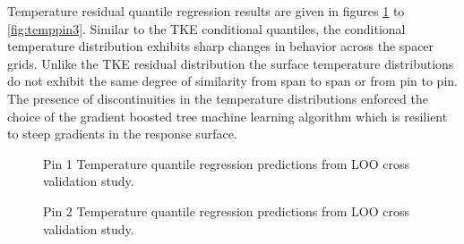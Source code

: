 Temperature residual quantile regression results are given in figures \ref{fig:temppin1} to \ref{fig:temppin3}.  Similar to the TKE conditional quantiles, the conditional temperature distribution exhibits sharp changes in behavior across the spacer grids. Unlike the TKE residual distribution the surface temperature distributions do not exhibit the same degree of similarity from span to span or from pin to pin.  The presence of discontinuities in the temperature distributions enforced the choice of the gradient boosted tree machine learning algorithm which is resilient to steep gradients in the response surface.

\begin{figure}[H]%
    \captionsetup[subfigure]{justification=centering}
    \centering
    \hspace*{-1.0em}%
    \caption[Q-Q LOO Temperature pin 1 results.]{Pin 1 Temperature quantile regression predictions from LOO cross validation study.}%
    \label{fig:temppin1}%
\end{figure}

\begin{figure}[H]%
    \captionsetup[subfigure]{justification=centering}
    \centering
    \hspace*{-1.0em}%
    \caption[Q-Q LOO Temperature pin 2 results.]{Pin 2 Temperature quantile regression predictions from LOO cross validation study.}%
    \label{fig:temppin2}%
\end{figure}

